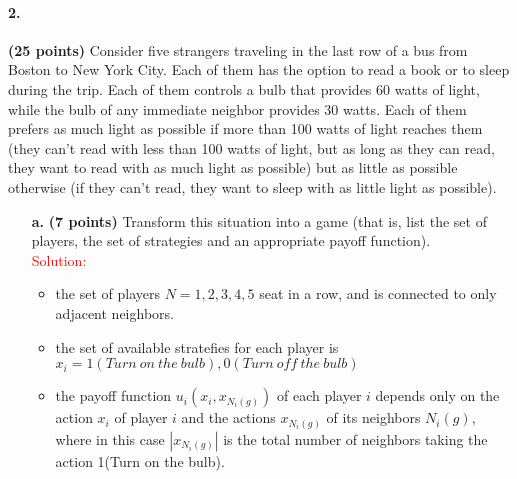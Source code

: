 \documentclass[11pt]{article} %
\begin{document}
\paragraph{2.} \textbf{(25 points)} Consider five strangers traveling in the last row of a bus from Boston to New York City. Each of them has the option to read a book or to sleep during the trip. Each of them controls a bulb that provides $60$ watts of light, while the bulb of any immediate neighbor provides $30$ watts. Each of them prefers as much light as possible if more than 100 watts of light reaches them (they can't read with less than 100 watts of light, but as long as they can read, they want to read with as much light as possible) but as little as possible otherwise (if they can't read, they want to sleep with as little light as possible).

\begin{itemize}
\item[\textbf{a.}] \textbf{(7 points)}  Transform this situation into a game (that is, list the set of players, the set of strategies and an appropriate payoff function).\\

\textcolor{red}{Solution:}

\begin{itemize}
\item the set of players $N={1,2,3,4,5}$ seat in a row, and is connected to only adjacent neighbors.
 
\begin{center}
\end{center}

\item the set of available stratefies for each player is $x_i={1(Turn \ on \  the \  bulb), 0(Turn \  off \ the \  bulb)}$

\item the payoff function $u_i(x_i,x_{N_i(g)})$ of each player $i$ depends only on the action $x_i$ of player $i$ and the actions $x_{N_i(g)}$ of its neighbors $N_i(g)$, where in this case $|x_{N_i(g)}|$ is the total number of neighbors taking the action 1(Turn on the bulb).


\end{itemize}
\end{itemize}
\end{document}
